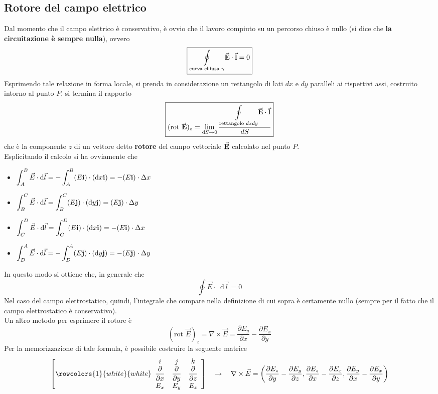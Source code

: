 \documentclass[a4paper]{extarticle}
\newcommand\dif{\mathop{}\!\mathrm{d}}
\begin{document}
\subsection{Rotore del campo elettrico}
Dal momento che il campo elettrico è conservativo, è ovvio che il lavoro compiuto su un percorso chiuso è nullo (si dice che \textbf{la circuitazione è sempre nulla}), ovvero
\[\boxed{\underset{\text{curva chiusa } \gamma}{\oint} \va{E} \cdot \va{l} = 0}\]
Esprimendo tale relazione in forma locale, si prenda in considerazione un rettangolo di lati $dx$ e $dy$ paralleli ai rispettivi assi, costruito intorno al punto $P$, si termina il rapporto
\[\boxed{(\text{rot } \va{E})_z = \lim_{\dif S \to 0} \dfrac{\displaystyle{\underset{\text{rettangolo } dx dy}{\oint} \va{E} \cdot \va{l}}}{dS}}\]
che è la componente $z$ di un vettore detto \textbf{rotore} del campo vettoriale $\va{E}$ calcolato nel punto $P$.\\
Esplicitando il calcolo si ha ovviamente che
\begin{itemize}
  \item $\displaystyle{\int_A^B \vec E \cdot \dif \vec l = -\int_A^B (E {\bf{i}}) \cdot (\dif x {\bf{i}}) = -(E {\bf{i}}) \cdot \Delta x}$
  \item $\displaystyle{\int_B^C \vec E \cdot \dif \vec l = \int_B^C (E {\bf{j}}) \cdot (\dif y {\bf{j}}) = (E {\bf{j}}) \cdot \Delta y}$
  \item $\displaystyle{\int_C^D \vec E \cdot \dif \vec l = \int_C^D (E {\bf{i}}) \cdot (\dif x {\bf{i}}) = -(E {\bf{i}}) \cdot \Delta x}$
  \item $\displaystyle{\int_D^A \vec E \cdot \dif \vec l = -\int_D^A (E {\bf{j}}) \cdot (\dif y {\bf{j}}) = -(E {\bf{j}}) \cdot \Delta y}$
\end{itemize}
In questo modo si ottiene che, in generale che
\[\oint \vec E \cdot \dif \vec l = 0\]
Nel caso del campo elettrostatico, quindi, l'integrale che compare nella definizione di cui sopra è certamente nullo (sempre per il fatto che il campo elettrostatico è conservativo).\\
Un altro metodo per esprimere il rotore è
\[(\text{rot } \vec E)_z = \nabla \times \vec E = \frac{\partial E_y}{\partial x} - \frac{\partial E_x}{\partial y}\]
Per la memorizzazione di tale formula, è possibile costruire la seguente matrice
\[\left[
  \rowcolors{1}{white}{white}
  \begin{array}{ccc}
  i & j & k\\
  \dfrac{\partial}{\partial x} & \dfrac{\partial}{\partial y} & \dfrac{\partial}{\partial z}\\
  E_x & E_y & E_z
\end{array}\right] \hspace{1em} \rightarrow \hspace{1em} \nabla \times \vec E = \left(\frac{\partial E_z}{\partial y} - \frac{\partial E_y}{\partial z},\frac{\partial E_z}{\partial x} - \frac{\partial E_x}{\partial z},\frac{\partial E_y}{\partial x} - \frac{\partial E_x}{\partial y} \right)\]
\end{document}
